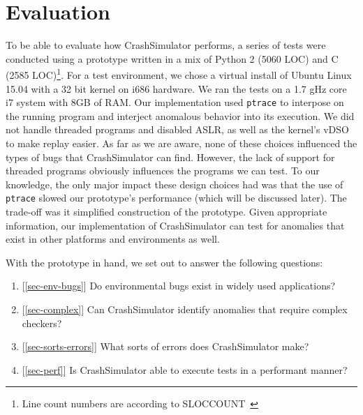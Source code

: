 \section{Evaluation}
\label{sec:evaluation}


To be able to evaluate how CrashSimulator performs, a series of tests were
conducted using a prototype written in a mix of 
Python 2 (5060 LOC) and C (2585 
LOC)\footnote{ Line count numbers are according to SLOCCOUNT~\cite{SLOCCOUNT}}.  
For a test
environment, we chose a virtual install of Ubuntu Linux 15.04 with a 32 bit 
kernel on i686 hardware.
We ran the tests on a 1.7 gHz core i7 system with 8GB of RAM. Our
implementation used {\tt ptrace} to interpose on the running program and
interject anomalous behavior into its execution.
We did not handle threaded programs and disabled ASLR, as well as the kernel's vDSO 
to make replay easier.  As far as we are aware, none of these choices 
influenced the types of bugs that CrashSimulator can find. However, the lack of support
for threaded programs obviously influences the programs we can test.  To our
knowledge, the 
only major impact these design choices had was that the use of {\tt ptrace} 
slowed our prototype's performance (which will be discussed later).  The
trade-off was it simplified 
construction of the prototype. Given appropriate information, 
our implementation of CrashSimulator can
test for anomalies that exist in other platforms and environments as well.

With the prototype in hand,  we set out to answer the following questions:

\begin{enumerate}
   \item{[\ref{sec-env-bugs}] Do environmental bugs exist in widely used applications?}
   \item{[\ref{sec-complex}] Can CrashSimulator identify anomalies that require
       complex checkers?}
   \item{[\ref{sec-sorts-errors}] What sorts of errors does CrashSimulator make?}
   \item{[\ref{sec-perf}] Is CrashSimulator able to execute tests in a performant manner?}
\end{enumerate}



